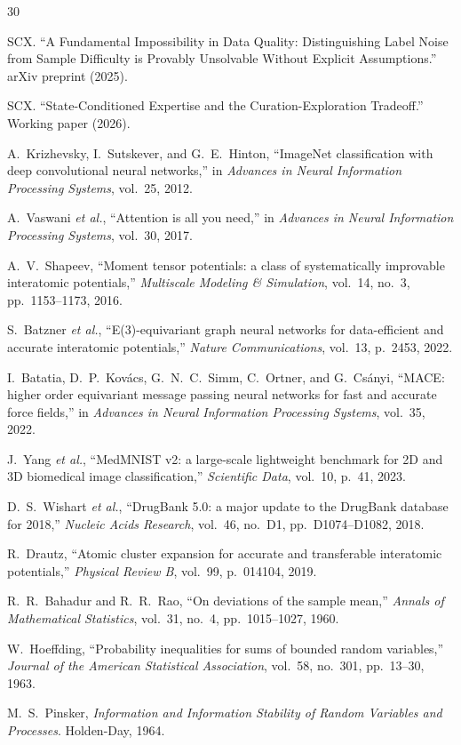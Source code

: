 \documentclass[12pt,a4paper]{article}
\begin{document}
\begin{thebibliography}{30}

SCX. ``A Fundamental Impossibility in Data Quality: Distinguishing Label Noise from Sample Difficulty is Provably Unsolvable Without Explicit Assumptions.'' arXiv preprint (2025).

SCX. ``State-Conditioned Expertise and the Curation-Exploration Tradeoff.'' Working paper (2026).

A.~Krizhevsky, I.~Sutskever, and G.~E.~Hinton, ``ImageNet classification with deep convolutional neural networks,'' in \textit{Advances in Neural Information Processing Systems}, vol.~25, 2012.

A.~Vaswani \textit{et al.}, ``Attention is all you need,'' in \textit{Advances in Neural Information Processing Systems}, vol.~30, 2017.

A.~V.~Shapeev, ``Moment tensor potentials: a class of systematically improvable interatomic potentials,'' \textit{Multiscale Modeling \& Simulation}, vol.~14, no.~3, pp.~1153--1173, 2016.

S.~Batzner \textit{et al.}, ``E(3)-equivariant graph neural networks for data-efficient and accurate interatomic potentials,'' \textit{Nature Communications}, vol.~13, p.~2453, 2022.

I.~Batatia, D.~P.~Kov\'acs, G.~N.~C.~Simm, C.~Ortner, and G.~Cs\'anyi, ``MACE: higher order equivariant message passing neural networks for fast and accurate force fields,'' in \textit{Advances in Neural Information Processing Systems}, vol.~35, 2022.

J.~Yang \textit{et al.}, ``MedMNIST v2: a large-scale lightweight benchmark for 2D and 3D biomedical image classification,'' \textit{Scientific Data}, vol.~10, p.~41, 2023.

D.~S.~Wishart \textit{et al.}, ``DrugBank 5.0: a major update to the DrugBank database for 2018,'' \textit{Nucleic Acids Research}, vol.~46, no.~D1, pp.~D1074--D1082, 2018.

R.~Drautz, ``Atomic cluster expansion for accurate and transferable interatomic potentials,'' \textit{Physical Review B}, vol.~99, p.~014104, 2019.

R.~R.~Bahadur and R.~R.~Rao, ``On deviations of the sample mean,'' \textit{Annals of Mathematical Statistics}, vol.~31, no.~4, pp.~1015--1027, 1960.

W.~Hoeffding, ``Probability inequalities for sums of bounded random variables,'' \textit{Journal of the American Statistical Association}, vol.~58, no.~301, pp.~13--30, 1963.

M.~S.~Pinsker, \textit{Information and Information Stability of Random Variables and Processes}. Holden-Day, 1964.

\end{thebibliography}
\end{document}
